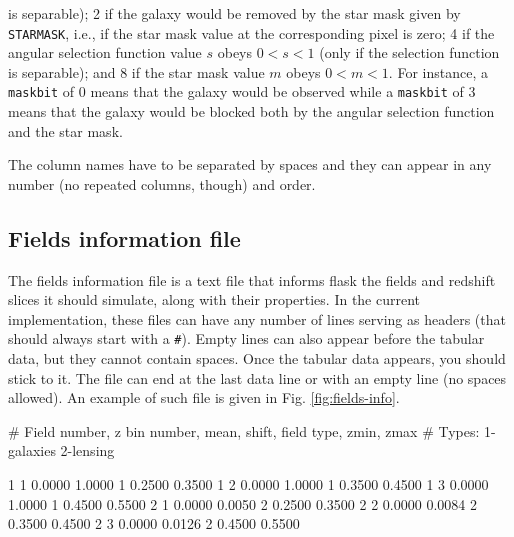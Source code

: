 \documentclass[12pt]{book} %
\newenvironment{alltt}{\ttfamily}{\par}
\begin{document}
\begin{itemize}
\begin{itemize}
    is separable); 2 if the galaxy would be removed by the star mask given by {\tt STARMASK}, 
    i.e., if the star mask value at the corresponding pixel is zero; 4 if the angular selection function 
    value $s$ obeys $0<s<1$ (only if the selection function is separable); and 8 if the star mask 
    value $m$ obeys $0<m<1$. For instance, a {\tt maskbit} of 0 means that the galaxy would be observed 
    while a {\tt maskbit} of 3 means that the galaxy would be blocked both by the angular selection
    function and the star mask.
  \end{itemize}
  The column names have to be separated by spaces and they can appear in any number (no repeated 
  columns, though) and order.
\end{itemize}


\subsection{Fields information file}
\label{sec:fields-info}

The fields information file is a text file that informs {\sc flask} the fields and redshift 
slices it should simulate, along with their properties. In the current implementation, these 
files can have any number of lines serving as headers (that should always start with a {\tt \#}). 
Empty lines can also appear before the tabular data, but they cannot contain spaces. Once 
the tabular data appears, you should stick to it. The file can end at the last data line or 
with an empty line (no spaces allowed). An example of such file is given in Fig. \ref{fig:fields-info}.

\begin{alltt}
\begin{center}
\begin{boxedverbatim}
# Field number, z bin number, mean, shift, field type, zmin, zmax
# Types: 1-galaxies 2-lensing

     1      1   0.0000   1.0000      1   0.2500   0.3500
     1      2   0.0000   1.0000      1   0.3500   0.4500
     1      3   0.0000   1.0000      1   0.4500   0.5500
     2      1   0.0000   0.0050      2   0.2500   0.3500
     2      2   0.0000   0.0084      2   0.3500   0.4500
     2      3   0.0000   0.0126      2   0.4500   0.5500
\end{boxedverbatim}
\end{center}
\end{alltt}
\end{document}
